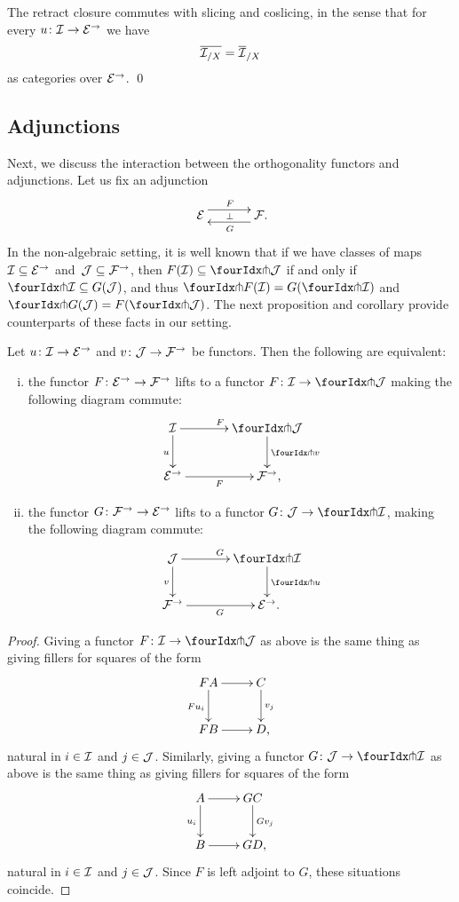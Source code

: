 \documentclass[reqno,10pt,a4paper,oneside,draft]{amsart}
\begin{document}
\begin{proposition}
The retract closure commutes with slicing and coslicing, in the sense that for every $u \co \cal{I} \to \catE^\to$ we have
\[
\overline{\cal{I}_{/X}} = \overline{\cal{I}}_{/X}
\]
as categories over $\catE^\to$.
\qed
\end{proposition}

\subsection*{Adjunctions}

Next, we discuss the interaction between the orthogonality functors and adjunctions.
Let us fix an adjunction
\[
\xymatrix@C+1em{
  \catE
  \ar@<5pt>[r]^{F}
  \ar@{}[r]|{\bot}
&
  \cal{F}
  \ar@<5pt>[l]^{G} \rlap{.}
}
\]
In the non-algebraic setting, it is well known that if we have classes of maps $\cal{I} \subseteq \catE^\to$ and~$\cal{J} \subseteq \cal{F}^\to$, then $F(\cal{I}) \subseteq \liftl{\cal{J}}$ if and only if $\liftr{\cal{I}} \subseteq G(\cal{J})$, and thus $\liftr{F(\cal{I})} = G(\liftr{\cal{I}})$ and $\liftl{G(\cal{J})} = F(\liftl{\cal{J}})$.
The next proposition and corollary provide counterparts of these facts in our setting.

\begin{proposition} \label{lift-of-adjunction}
Let $u \co \cal{I} \to \catE^\to$ and $v \co \cal{J} \to \cal{F}^\to$ be functors.
Then the following are equivalent:
\begin{enumerate}[(i)]
\item the functor $F \co \catE^\to \to \cal{F}^\to$ lifts to a functor $F \co \cal{I} \to \liftl{\cal{J}}$ making the following diagram commute:
\[
\xymatrix@C=1.2cm{
  \cal{I}
  \ar[r]^{F}
  \ar[d]_{u}
&
  \liftl{\cal{J}}
  \ar[d]^{\liftl{v}}
\\
  \catE^\to
  \ar[r]_-{F}
&
  \cal{F}^\to
\rlap{,}}
\]
\item the functor $G \co \cal{F}^\to \to \catE^\to$ lifts to a functor $G \co \cal{J} \to \liftr{\cal{I}}$, making the following diagram commute:
\[
\xymatrix@C=1.2cm{
  \cal{J}
    \ar[d]_{v}
\ar[r]^{G}
&
  \liftr{\cal{I}}
  \ar[d]^{\liftr{u}}
\\
  \cal{F}^\to
   \ar[r]_{G}
&
  \catE^\to
\rlap{.}}
\]
\end{enumerate}
\end{proposition}

\begin{proof}
Giving a functor $F \co \cal{I} \to \liftl{\cal{J}}$ as above is the same thing as giving fillers for squares of the form
\[
\xymatrix{
  FA \ar[d]_{F u_i} \ar[r] & C \ar[d]^{v_j} \\
  FB \ar[r] & D \rlap{,}
}
\]
natural in $i \in \cal{I}$ and $j \in \cal{J}$.
Similarly, giving a functor $G \co \cal{J} \to \liftl{\cal{I}}$ as above is the same thing as giving fillers for squares of the form
\[
\xymatrix{
  A \ar[d]_{u_i} \ar[r] & GC \ar[d]^{Gv_j} \\
  B \ar[r] & GD \rlap{,}
}
\]
natural in $i \in \cal{I}$ and $j \in \cal{J}$.
Since $F$ is left adjoint to $G$, these situations coincide.
\end{proof}
\end{document}
